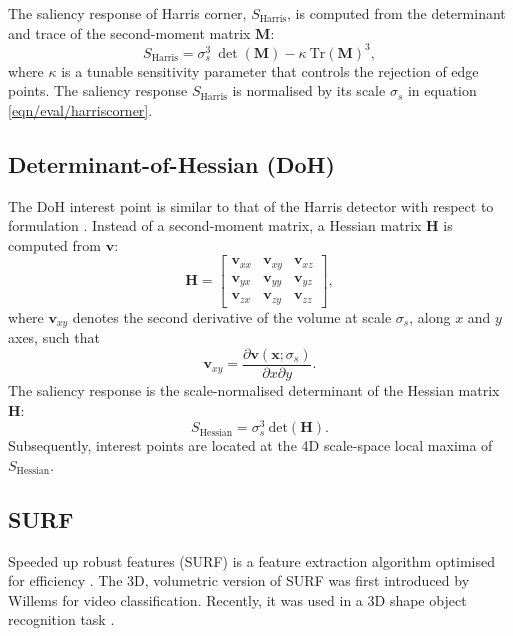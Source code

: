 The saliency response of Harris corner, $S_\textrm{Harris}$, is computed from the determinant and trace of the second-moment matrix $\mathbf{M}$: 
\begin{equation}
	S_\textrm{Harris} = \sigma_{s}^3 \:\det(\mathbf{M}) - \kappa\:\mathrm{Tr(\mathbf{M})}^3,
	\label{eqn/eval/harriscorner}
\end{equation}
where $\kappa$ is a tunable sensitivity parameter that controls the rejection of edge points.  
The saliency response $S_\textrm{Harris}$ is normalised by its scale $\sigma_s$ in equation \ref{eqn/eval/harriscorner}.

\subsection{Determinant-of-Hessian (DoH)}
\label{sec/eval/doh}
The DoH interest point is similar to that of the Harris detector with respect to formulation \cite{Lindeberg1998}. Instead of a second-moment matrix, a Hessian matrix $\mathbf{H}$ is computed from $\mathbf{v}$: 
\begin{equation}
	\mathbf{H} = 
	\left[
		\begin{array}{ccc}
			\mathbf{v}_{xx} & \mathbf{v}_{xy} & \mathbf{v}_{xz} \\
			\mathbf{v}_{yx} & \mathbf{v}_{yy} & \mathbf{v}_{yz} \\
			\mathbf{v}_{zx} & \mathbf{v}_{zy} & \mathbf{v}_{zz} 
		\end{array}
	\right],
	\label{eqn/eval/hessianmatrix}
\end{equation}
where $\mathbf{v}_{xy}$ denotes the second derivative of the volume at scale $\sigma_s$, along $x$ and $y$ axes, such that
\begin{equation}
	\mathbf{v}_{xy} = \displaystyle\frac{\partial \mathbf{v}(\mathbf{x};\sigma_s)}{\partial x \partial y}.
	\label{eqn/eval/hessiandiverative}
\end{equation}
The saliency response is the scale-normalised determinant of the Hessian matrix $\mathbf{H}$:
\begin{equation}
	S_{\textrm{Hessian}} = \sigma^3_s \:\mathrm{det}(\mathbf{H}).
	\label{eqn/eval/hessiansaliency}
\end{equation}
Subsequently, interest points are located at the 4D scale-space local maxima of $S_\textrm{Hessian}$.

\subsection{SURF}
Speeded up robust features (SURF) is a feature extraction algorithm optimised for efficiency \cite{Bay2008}. The 3D, volumetric version of SURF was first introduced by Willems \etal \cite{Willems2008} for video classification. Recently, it was used in a 3D shape object recognition task \cite{Knopp2010}.

